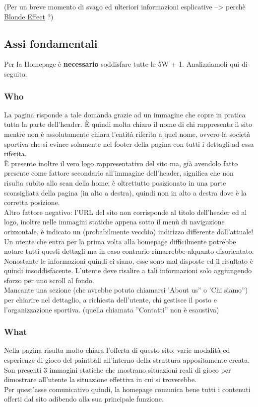 \documentclass[../Relazione.tex]{subfiles}
\begin{document}
    {\footnotesize(Per un breve momento di svago ed ulteriori informazioni esplicative --> perchè \href{https://www.youtube.com/watch?v=DctVteQDRIM}{Blonde Effect} ?)}


    \subsection{Assi fondamentali}

    Per la Homepage è \textbf{necessario} soddisfare tutte le 5W + 1. Analizziamoli qui di seguito.

        \subsubsection{Who}
        La pagina risponde a tale domanda grazie ad un immagine che copre in pratica tutta la parte dell'header.
        È quindi molta chiaro il nome di chi rappresenta il sito mentre non è assolutamente chiara l'entità riferita a quel nome, ovvero la società sportiva che si evince solamente nel footer della pagina con tutti i dettagli ad essa riferita.\\
        È presente inoltre il vero logo rappresentativo del sito ma, già avendolo fatto presente come fattore secondario all'immagine dell'header, significa che non risulta subito allo scan della home; è oltrettutto posizionato in una parte sconsigliata della pagina (in alto a destra), quindi non in alto a destra dove è la corretta posizione.\\
        Altro fattore negativo: l'URL del sito non corrisponde al titolo dell'header ed al logo, inoltre nelle immagini statiche appena sotto il menù di navigazione orizzontale, è indicato un (probabilmente vecchio) indirizzo differente dall'attuale!\\
        Un utente che entra per la prima volta alla homepage difficilmente potrebbe notare tutti questi dettagli ma in caso contrario rimarrebbe alquanto disorientato.\\
        Nonostante le informazioni quindi ci siano, esse sono mal disposte ed il risultato è quindi insoddisfacente. L’utente deve risalire a tali informazioni solo aggiungendo sforzo per uno scroll al fondo.\\
        Mancante una sezione (che avrebbe potuto chiamarsi 'About us'' o 'Chi siamo'') per chiarire nel dettaglio, a richiesta dell'utente, chi gestisce il posto e l'organizzazione sportiva. (quella chiamata ''Contatti'' non è esaustiva)

        \subsubsection{What}
        Nella pagina risulta molto chiara l'offerta di questo sito: varie modalità ed esperienze di gioco del paintball all'interno della struttura appositamente creata.
        Son presenti 3 immagini statiche che mostrano situazioni reali di gioco per dimostrare all'utente la situazione effettiva in cui si troverebbe.\\
        Per quest'asse comunicativo quindi, la homepage comunica bene tutti i contenuti offerti dal sito adibendo alla sua principale funzione.
\end{document}
